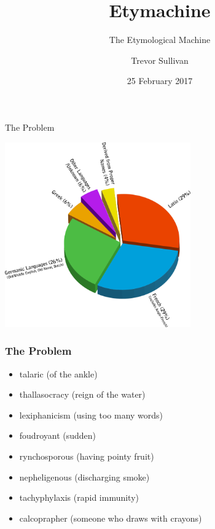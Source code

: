 \documentclass[10pt]{beamer}
\title{Etymachine}
\subtitle{The Etymological Machine}
\date{25 February 2017}
\author{Trevor Sullivan}
\institute{University of Arizona}
\begin{document}
 

\maketitle


\begin{frame}[fragile]{The Problem}

  \includegraphics[width=8cm]{badchart.png}

  
\end{frame}

\begin{frame}[fragile]
  \frametitle{The Problem}

  \begin{itemize}[<+->]
      \item talaric \pause (of the ankle)
      \item thallasocracy \pause (reign of the water)
      \item lexiphanicism \pause (using too many words)
      \item foudroyant \pause (sudden)
      \item rynchosporous \pause (having pointy fruit)
      \item nepheligenous \pause (discharging smoke)
      \item tachyphylaxis \pause (rapid immunity)
      \item calcoprapher \pause (someone who draws with crayons)
    \end{itemize}  
\end{frame}
\end{document}
